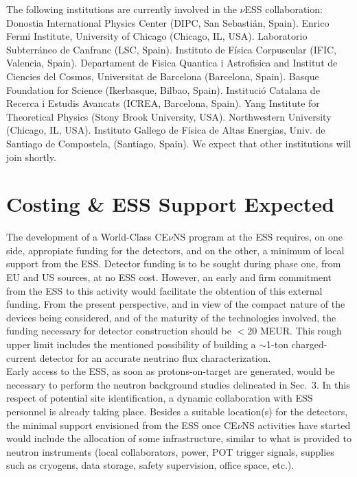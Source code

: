 \documentclass[12pt]{article}
\begin{document}
The following institutions are currently involved in the $\nu$ESS collaboration: Donostia  International  Physics  Center  (DIPC, San Sebasti\'an, Spain). Enrico Fermi Institute, University  of  Chicago (Chicago, IL, USA). Laboratorio Subterr\'aneo de Canfranc (LSC, Spain). Instituto  de  F\'isica  Corpuscular (IFIC, Valencia, Spain).  Departament  de  Fisica  Quantica  i  Astrofisica  and  Institut  de  Ciencies  del  Cosmos, Universitat  de  Barcelona  (Barcelona, Spain).  Basque  Foundation  for  Science (Ikerbasque,  Bilbao, Spain).  Instituci\'o  Catalana  de  Recerca  i  Estudis  Avancats  (ICREA, Barcelona, Spain).  Yang  Institute  for  Theoretical  Physics  (Stony  Brook  University, USA). Northwestern University (Chicago, IL, USA). Instituto 
Gallego  de  F\'isica  de  Altas  Energias,  Univ.  de  Santiago  de  Compostela, (Santiago, Spain). We expect that other institutions will join shortly. 

\newpage

\section{Costing \& ESS Support Expected}

The development of a World-Class CE$\nu$NS program at the ESS requires, on one side, appropiate funding for the detectors, and on the other, a minimum of local support from the ESS.  Detector funding is to be sought during phase one, from EU and US sources, at no ESS cost. However, an early and firm commitment from the ESS to this activity would facilitate the obtention of this external funding. From the present perspective, and in view of the compact nature of the devices being considered, and of the maturity of the technologies involved, the funding necessary for detector construction should be  $<$20 MEUR. This rough upper limit includes the mentioned possibility of building a $\sim$1-ton charged-current detector for an accurate neutrino flux characterization.\\

Early access to the ESS, as soon as protons-on-target are generated, would be necessary  to perform the neutron background studies delineated in Sec.\ 3. In this respect of potential site identification,  a dynamic collaboration with ESS personnel is already taking place. Besides a suitable location(s) for the detectors, the minimal support envisioned from the ESS once CE$\nu$NS activities have started would include the allocation of some infrastructure, similar to what is provided to neutron instruments (local collaborators, power, POT trigger signals, supplies such as cryogens, data storage, safety supervision, office space, etc.).
\end{document}
